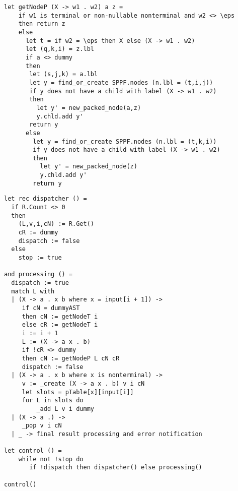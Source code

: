 \documentclass[12pt]{article}  %
\theoremstyle{definition}
\theoremstyle{remark}
\begin{document}
\begin{verbatim}
let getNodeP (X -> w1 . w2) a z =
    if w1 is terminal or non-nullable nonterminal and w2 <> \eps
    then return z
    else 
      let t = if w2 = \eps then X else (X -> w1 . w2)
      let (q,k,i) = z.lbl
      if a <> dummy
      then
       let (s,j,k) = a.lbl
       let y = find_or_create SPPF.nodes (n.lbl = (t,i,j))
       if y does not have a child with label (X -> w1 . w2)
       then
         let y' = new_packed_node(a,z)
         y.chld.add y'
       return y
      else
        let y = find_or_create SPPF.nodes (n.lbl = (t,k,i))   
        if y does not have a child with label (X -> w1 . w2)
        then
          let y' = new_packed_node(z)
          y.chld.add y'
        return y

\end{verbatim}


\begin{verbatim}
let rec dispatcher () = 
  if R.Count <> 0 
  then 
    (L,v,i,cN) := R.Get() 
    cR := dummy
    dispatch := false 
  else 
    stop := true 

and processing () =  
  dispatch := true 
  match L with
  | (X -> a . x b where x = input[i + 1]) ->
     if cN = dummyAST 
     then cN := getNodeT i
     else cR := getNodeT i
     i := i + 1
     L := (X -> a x . b)
     if !cR <> dummy
     then cN := getNodeP L cN cR 
     dispatch := false 
  | (X -> a . x b where x is nonterminal) ->
     v := _create (X -> a x . b) v i cN
     let slots = pTable[x][input[i]]  
     for L in slots do             
         _add L v i dummy
  | (X -> a .) -> 
     _pop v i cN
  | _ -> final result processing and error notification

let control () = 
    while not !stop do 
       if !dispatch then dispatcher() else processing() 

control() 

\end{verbatim}
\end{document}
